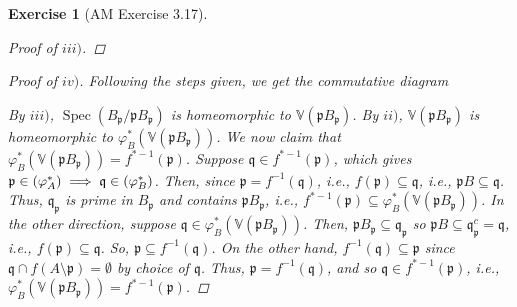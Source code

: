 \documentclass[12pt,letterpaper]{article}
\newtheorem{problem}{Exercise}[section]
\theoremstyle{definition}
\theoremstyle{remark}
\numberwithin{figure}{problem}
\numberwithin{equation}{section}
\let\Im\relax
\DeclareMathOperator{\Im}{Im}
\DeclareMathOperator{\Spec}{Spec}
\begin{document}
\begin{problem} [AM Exercise 3.17]
\begin{proof}[Proof of $iii)$]
\end{proof}
\begin{proof}[Proof of $iv)$]
  Following the steps given, we get the commutative diagram
  \begin{center}
  \end{center}
  By $iii)$, $\Spec(B_\mathfrak{p}/\mathfrak{p}B_\mathfrak{p})$ is homeomorphic to $\mathbb{V}(\mathfrak{p}B_\mathfrak{p})$. By $ii)$, $\mathbb{V}(\mathfrak{p}B_\mathfrak{p})$ is homeomorphic to $\varphi_B^*(\mathbb{V}(\mathfrak{p}B_\mathfrak{p}))$. We now claim that $\varphi_B^*(\mathbb{V}(\mathfrak{p}B_\mathfrak{p})) = f^{*-1}(\mathfrak{p})$. Suppose $\mathfrak{q} \in f^{*-1}(\mathfrak{p})$, which gives $\mathfrak{p} \in \Im(\varphi_A^*) \implies \mathfrak{q} \in \Im(\varphi_B^*)$. Then, since $\mathfrak{p} = f^{-1}(\mathfrak{q})$, i.e., $f(\mathfrak{p}) \subseteq \mathfrak{q}$, i.e., $\mathfrak{p}B \subseteq \mathfrak{q}$. Thus, $\mathfrak{q}_\mathfrak{p}$ is prime in $B_\mathfrak{p}$ and contains $\mathfrak{p}B_\mathfrak{p}$, i.e., $f^{*-1}(\mathfrak{p}) \subseteq \varphi_B^*(\mathbb{V}(\mathfrak{p}B_\mathfrak{p}))$. In the other direction, suppose $\mathfrak{q} \in \varphi_B^*(\mathbb{V}(\mathfrak{p}B_\mathfrak{p}))$. Then, $\mathfrak{p}B_\mathfrak{p} \subseteq \mathfrak{q}_\mathfrak{p}$ so $\mathfrak{p}B \subseteq \mathfrak{q}_\mathfrak{p}^c = \mathfrak{q}$, i.e., $f(\mathfrak{p}) \subseteq \mathfrak{q}$. So, $\mathfrak{p} \subseteq f^{-1}(\mathfrak{q})$. On the other hand, $f^{-1}(\mathfrak{q}) \subseteq \mathfrak{p}$ since $\mathfrak{q} \cap f(A \setminus \mathfrak{p}) = \emptyset$ by choice of $\mathfrak{q}$. Thus, $\mathfrak{p} = f^{-1}(\mathfrak{q})$, and so $\mathfrak{q} \in f^{*-1}(\mathfrak{p})$, i.e., $\varphi_B^*(\mathbb{V}(\mathfrak{p}B_\mathfrak{p})) = f^{*-1}(\mathfrak{p})$.

\end{proof}
\end{problem}
\end{document}
